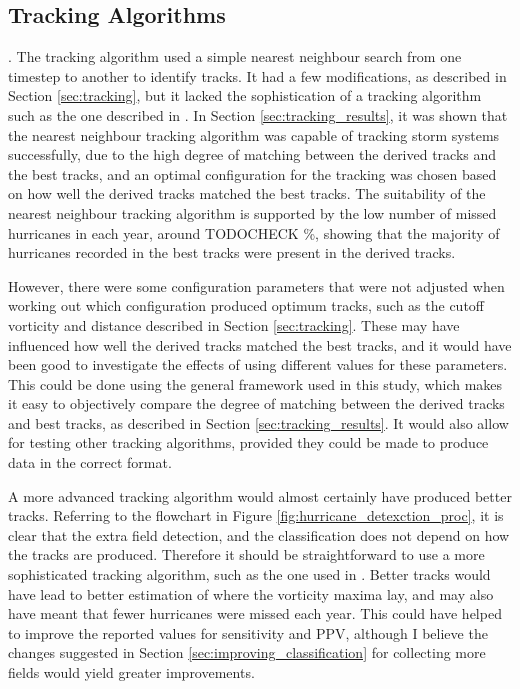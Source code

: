 \documentclass[pdftex,12pt,a4paper]{report}
\begin{document}
\subsection{Tracking Algorithms}
\label{sec:discussion_tracking_algs}.
The tracking algorithm used a simple nearest neighbour search from one timestep to another to
identify tracks. It had a few modifications, as described in Section \ref{sec:tracking}, but it
lacked the sophistication of a tracking algorithm such as the one described in
\textcite{hodges1994general, hodges1999adaptive}. In Section \ref{sec:tracking_results}, it was
shown that the nearest neighbour tracking algorithm was capable of tracking storm systems
successfully, due to the high degree of matching between the derived tracks and the best tracks, and an
optimal configuration for the tracking was chosen based on how well the derived tracks matched the
best tracks. The suitability of the nearest neighbour tracking algorithm is supported by the low
number of missed hurricanes in each year, around TODOCHECK \%, showing that the majority of
hurricanes recorded in the best tracks were present in the derived tracks. 

However, there were some configuration parameters that were not adjusted when working out which
configuration produced optimum tracks, such as the cutoff vorticity and distance described in Section
\ref{sec:tracking}. These may have influenced how well the derived tracks matched the best tracks,
and it would have been good to investigate the effects of using different values for these
parameters. This could be done using the general framework used in this study, which makes it easy
to objectively compare the degree of matching between the derived tracks and best tracks, as
described in Section \ref{sec:tracking_results}. It would also allow for testing other tracking
algorithms, provided they could be made to produce data in the correct format. 


A more advanced tracking algorithm would almost certainly have produced better tracks. Referring to
the flowchart in Figure \ref{fig:hurricane_detexction_proc}, it is clear that the extra field
detection, and the classification does not depend on how the tracks are produced. Therefore it
should be straightforward to use a more sophisticated tracking algorithm, such as the one used in
\textcite{thorncroft2001african}. Better tracks would have lead to better estimation of where the
vorticity maxima lay, and may also have meant that fewer hurricanes were missed each year. This
could have helped to improve the reported values for sensitivity and PPV, although I believe the
changes suggested in Section \ref{sec:improving_classification} for collecting more fields
would yield greater improvements.
\end{document}
